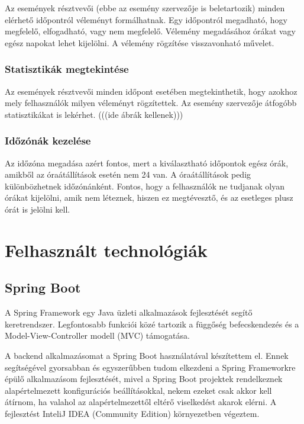 \documentclass[a4paper,12pt]{report}
\theoremstyle{definition}
\theoremstyle{remark}
\begin{document}
Az események résztvevői (ebbe az esemény szervezője is beletartozik) minden elérhető időpontról véleményt formálhatnak. Egy időpontról megadható, hogy megfelelő, elfogadható, vagy nem megfelelő. Vélemény megadásához órákat vagy egész napokat lehet kijelölni. A vélemény rögzítése visszavonható művelet.

	\subsection{Statisztikák megtekintése}

Az események résztvevői minden időpont esetében megtekinthetik, hogy azokhoz mely felhasználók milyen véleményt rögzítettek. Az esemény szervezője átfogóbb statisztikákat is lekérhet. (((ide ábrák kellenek)))

	\subsection{Időzónák kezelése}

Az időzóna megadása azért fontos, mert a  kiválasztható időpontok egész órák, amikből az óraátállítások esetén nem 24 van. A óraátállítások pedig különbözhetnek időzónánként. Fontos, hogy a felhasználók ne tudjanak olyan órákat kijelölni, amik nem léteznek, hiszen ez megtévesztő, és az esetleges plusz órát is jelölni kell.

\chapter{Felhasznált technológiák}

\section{Spring Boot}

A Spring Framework egy Java üzleti alkalmazások fejlesztését segítő keretrendszer. Legfontosabb funkciói közé tartozik a függőség befecskendezés és a Model-View-Controller modell (MVC) támogatása.

A backend alkalmazásomat a Spring Boot\cite{Springwebsite} használatával készítettem el. Ennek segítségével gyorsabban és egyszerűbben tudom elkezdeni a Spring Frameworkre épülő alkalmazásom fejlesztését, mivel a Spring Boot projektek rendelkeznek alapértelmezett konfigurációs beállításokkal, nekem ezeket csak akkor kell átírnom, ha valahol az alapértelmezettől eltérő viselkedést akarok elérni. A fejlesztést InteliJ IDEA (Community Edition)\cite{IDEAwebsite} környezetben végeztem.
\end{document}
